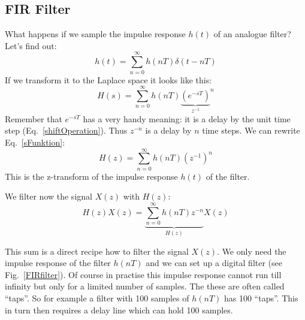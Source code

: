 \documentclass[12pt,a4paper]{article}
\begin{document}
\subsection{FIR Filter}
What happens if we sample the impulse response $h(t)$ of an
analogue filter? Let's find out:
\begin{equation}
\label{sampltime}
h(t)=\sum_{n=0}^\infty h(nT) \delta(t-nT)
\end{equation}
If we transform it to the Laplace space it looks like this:
\begin{equation}
\label{sFunktion}
H(s)=\sum_{n=0}^\infty h(nT) {\underbrace{{\left(e^{-sT}\right)}}_
                                           {z^{-1}}}^n
\end{equation}
Remember that $e^{-sT}$ has a very handy meaning: it is a delay
by the unit time step (Eq.~\ref{shiftOperation}).
Thus $z^{-n}$ is a delay by $n$ time steps.
We can rewrite Eq.~\ref{sFunktion}:
\begin{equation}
H(z)=\sum_{n=0}^\infty h(nT) {(z^{-1})}^n \label{ztrans}
\end{equation}
This is the z-transform of the impulse response $h(t)$ of the filter.

We filter now the signal $X(z)$ with $H(z)$:
\begin{equation}
\label{FIRz}
H(z)X(z)=\underbrace{\sum_{n=0}^\infty h(nT) z^{-n}}_{H(z)} X(z)
\end{equation}

This sum is a direct recipe how to filter the signal $X(z)$. We only
need the impulse response of the filter $h(nT)$ and we can
set up a digital filter (see Fig.~\ref{FIRfilter}). Of course
in practise this impulse response cannot run till infinity
but only for a limited number of samples. The these are often
called ``taps''. So for example a filter with 100 samples of $h(nT)$ has
100 ``taps''. This in turn then requires a delay line which
can hold 100 samples.
\end{document}
